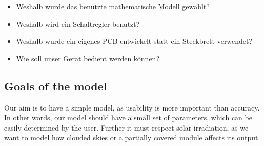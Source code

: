 \begin{itemize}
    \item
        Weshalb wurde das benutzte mathematische Modell gew\"ahlt?
    \item
        Weshalb wird ein Schaltregler benutzt?
    \item
        Weshalb wurde ein eigenes PCB entwickelt statt ein Steckbrett verwendet?
    \item
        Wie soll unser Ger\"at bedient werden k\"onnen?
\end{itemize}

\subsection{Goals of the model}
Our aim is to have a simple model, as usability is more important than accuracy. In other words, our model should have a small set of parameters, which can be easily determined by the user. Further it must respect solar irradiation, as we want to model how clouded skies or a partially covered module affects its output.
   
